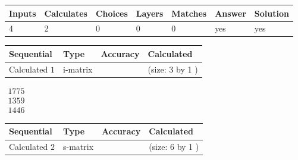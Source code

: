 \documentclass[12pt]{article}
\begin{document}
 
 
\noindent{}
 
 

 
 
 
\noindent{}
 
 

 
 
\noindent{}
 
 

 
\vspace{0.3in}
   
   
   
   
\noindent\begin{tabular}{|l|l|l|l|l|l|l|}
 \hline
Inputs & Calculates & Choices & Layers & Matches & Answer & Solution \\ \hline
           4  & 
           2  & 
           0
  & 
           0  & 
           0  & 
  yes & 
  yes 
  \\ \hline
 \end{tabular}
   
   
   
   
\noindent{}
   
   
  
  
\noindent\begin{tabular}{|l|l|l|l|}
\hline
 Sequential & Type & Accuracy & Calculated \\ 
\hline
 
 
  Calculated $            1 $ & i-matrix &  & 
 (size:            3  by            1 )
 \\  \hline  
 \end{tabular}
   
   
$\begin{array}{
 c
 }
        1775  \\ 
        1359  \\ 
        1446
 \end{array}  $ 
  
  
\noindent\begin{tabular}{|l|l|l|l|}
\hline
 Sequential & Type & Accuracy & Calculated \\ 
\hline
 
 
  Calculated $            2 $ & s-matrix & & 
 (size:            6  by            1 )
 \\  \hline  
 \end{tabular}
   
\end{document}
